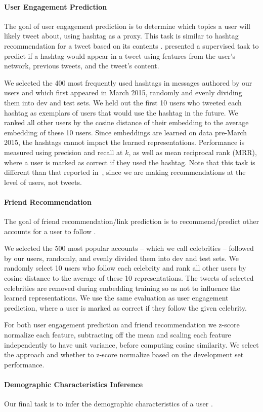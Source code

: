 \documentclass{article}
\newcommand{\myparagraph}[1]{\vspace{-.2cm}\paragraph{#1}}
\begin{document}
\myparagraph{User Engagement Prediction}
The goal of user engagement prediction is to determine which topics a user will likely tweet about, using hashtag as a proxy.
This task is similar to hashtag recommendation for a tweet based on its contents
\cite{kywe2012,she2014,zangerle2013}. 
 presented a supervised task to predict if a hashtag would appear in a tweet using features from
the user's network, previous tweets, and the tweet's content. 

We selected the 400 most frequently used hashtags in messages authored by our users and which first appeared in March 2015,
randomly and evenly dividing them into dev and test sets.
We held out the first 10 users who tweeted each hashtag as exemplars of users that would use the hashtag in the future.
We ranked all other users by the cosine distance of their embedding to the average embedding of these 10 users.
Since embeddings are learned on data pre-March 2015, the hashtags cannot impact the learned representations.
Performance is measured using precision and recall at $k$, as well as mean reciprocal rank (MRR), where a user is marked as correct
if they used the hashtag.  Note that this task is different than that reported in~, since we are making recommendations
at the level of users, not tweets.

\myparagraph{Friend Recommendation}
The goal of friend recommendation/link prediction is to recommend/predict other accounts for a user to follow \cite{liben2007}.


We selected the 500 most popular accounts -- which we call celebrities -- followed by our users, randomly, and evenly divided them into dev and test
sets.  We randomly select 10 users who follow each celebrity and rank all other users by cosine distance to the average of these 10 representations. The
tweets of selected celebrities are removed during embedding training so as not to influence the learned
representations. We use the same evaluation as user engagement prediction, where a user is marked as correct if they follow the given celebrity.

For both user engagement prediction and friend recommendation we z-score normalize each feature, subtracting off the mean
and scaling each feature independently to have unit variance, before computing cosine similarity.  We select the
approach and whether to z-score normalize based on the development set performance.

\myparagraph{Demographic Characteristics Inference}
Our final task is to infer the demographic characteristics of a user \cite{zamal2012,chen2015}.
\end{document}
